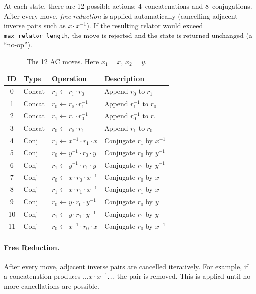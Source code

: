 \documentclass[11pt,a4paper]{article}
\newcommand{\inv}[1]{#1^{-1}}
\begin{document}
At each state, there are 12 possible actions: 4~concatenations and
8~conjugations.  After every move, \emph{free reduction} is applied
automatically (cancelling adjacent inverse pairs such as $x \cdot \inv{x}$).
If the resulting relator would exceed \texttt{max\_relator\_length}, the move is
rejected and the state is returned unchanged (a ``no-op'').

\begin{table}[h]
\centering
\caption{The 12 AC moves.  Here $x_1 = x$, $x_2 = y$.}
\label{tab:moves}
\small
\begin{tabular}{clll}
  \toprule
  \textbf{ID} & \textbf{Type} & \textbf{Operation} & \textbf{Description} \\
  \midrule
  0  & Concat & $r_1 \leftarrow r_1 \cdot r_0$               & Append $r_0$ to $r_1$ \\
  1  & Concat & $r_0 \leftarrow r_0 \cdot \inv{r_1}$         & Append $\inv{r_1}$ to $r_0$ \\
  2  & Concat & $r_1 \leftarrow r_1 \cdot \inv{r_0}$         & Append $\inv{r_0}$ to $r_1$ \\
  3  & Concat & $r_0 \leftarrow r_0 \cdot r_1$               & Append $r_1$ to $r_0$ \\
  \midrule
  4  & Conj   & $r_1 \leftarrow \inv{x} \cdot r_1 \cdot x$   & Conjugate $r_1$ by $\inv{x}$ \\
  5  & Conj   & $r_0 \leftarrow \inv{y} \cdot r_0 \cdot y$   & Conjugate $r_0$ by $\inv{y}$ \\
  6  & Conj   & $r_1 \leftarrow \inv{y} \cdot r_1 \cdot y$   & Conjugate $r_1$ by $\inv{y}$ \\
  7  & Conj   & $r_0 \leftarrow x \cdot r_0 \cdot \inv{x}$   & Conjugate $r_0$ by $x$ \\
  8  & Conj   & $r_1 \leftarrow x \cdot r_1 \cdot \inv{x}$   & Conjugate $r_1$ by $x$ \\
  9  & Conj   & $r_0 \leftarrow y \cdot r_0 \cdot \inv{y}$   & Conjugate $r_0$ by $y$ \\
  10 & Conj   & $r_1 \leftarrow y \cdot r_1 \cdot \inv{y}$   & Conjugate $r_1$ by $y$ \\
  11 & Conj   & $r_0 \leftarrow \inv{x} \cdot r_0 \cdot x$   & Conjugate $r_0$ by $\inv{x}$ \\
  \bottomrule
\end{tabular}
\end{table}

\paragraph{Free Reduction.}
After every move, adjacent inverse pairs are cancelled iteratively.  For
example, if a concatenation produces $\ldots x \cdot \inv{x} \ldots$, the pair
is removed.  This is applied until no more cancellations are possible.
\end{document}
